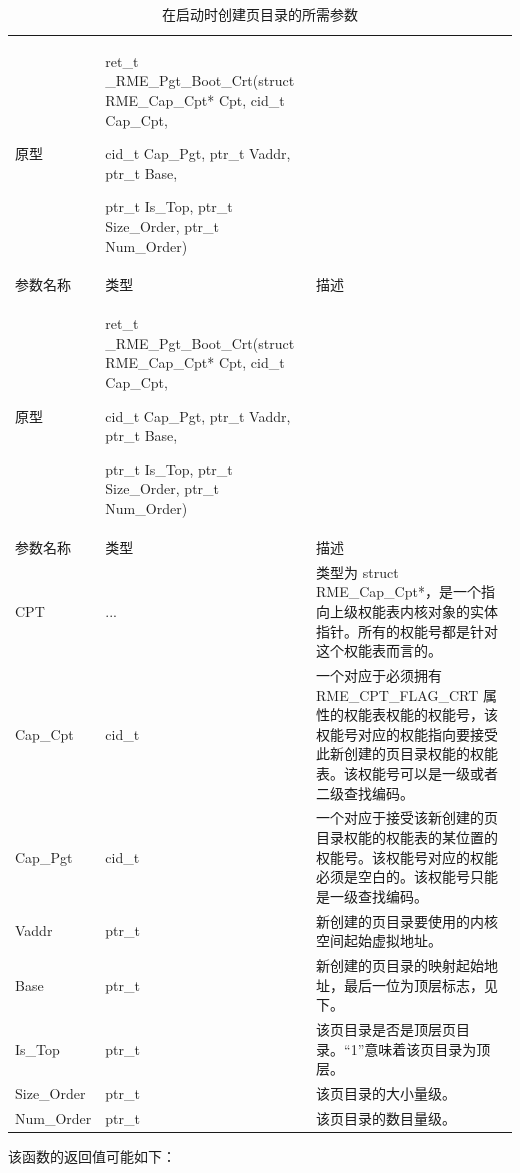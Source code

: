 \begin{xltabular}{\textwidth}{@{}>{\hsize\raggedright\arraybackslash}X>{\hsize\raggedright\arraybackslash}X>{\hsize\raggedright\arraybackslash}X@{}}
\caption{在启动时创建页目录的所需参数}\label{tab:7-45-create-page-directory-at-boot-parameters}\\
\toprule
原型\strut
 & ret\_t \_RME\_Pgt\_Boot\_Crt(struct RME\_Cap\_Cpt* Cpt, cid\_t Cap\_Cpt,

cid\_t Cap\_Pgt, ptr\_t Vaddr, ptr\_t Base,

ptr\_t Is\_Top, ptr\_t Size\_Order, ptr\_t Num\_Order)\strut
 & \strut
\tabularnewline
参数名称 & 类型 & 描述\tabularnewline
\endfirsthead
\toprule
原型\strut
 & ret\_t \_RME\_Pgt\_Boot\_Crt(struct RME\_Cap\_Cpt* Cpt, cid\_t Cap\_Cpt,

cid\_t Cap\_Pgt, ptr\_t Vaddr, ptr\_t Base,

ptr\_t Is\_Top, ptr\_t Size\_Order, ptr\_t Num\_Order)\strut
 & \strut
\tabularnewline
参数名称 & 类型 & 描述\tabularnewline
\midrule
\endhead
\bottomrule
\endlastfoot
CPT & ... &
类型为 struct RME\_Cap\_Cpt*，是一个指向上级权能表内核对象的实体指针。所有的权能号都是针对这个权能表而言的。\tabularnewline
Cap\_Cpt & cid\_t &
一个对应于必须拥有 RME\_CPT\_FLAG\_CRT 属性的权能表权能的权能号，该权能号对应的权能指向要接受此新创建的页目录权能的权能表。该权能号可以是一级或者二级查找编码。\tabularnewline
Cap\_Pgt & cid\_t &
一个对应于接受该新创建的页目录权能的权能表的某位置的权能号。该权能号对应的权能必须是空白的。该权能号只能是一级查找编码。\tabularnewline
Vaddr & ptr\_t &
新创建的页目录要使用的内核空间起始虚拟地址。\tabularnewline
Base & ptr\_t &
新创建的页目录的映射起始地址，最后一位为顶层标志，见下。\tabularnewline
Is\_Top & ptr\_t &
该页目录是否是顶层页目录。``1''意味着该页目录为顶层。\tabularnewline
Size\_Order & ptr\_t & 该页目录的大小量级。\tabularnewline
Num\_Order & ptr\_t & 该页目录的数目量级。\tabularnewline
\end{xltabular}

该函数的返回值可能如下：

